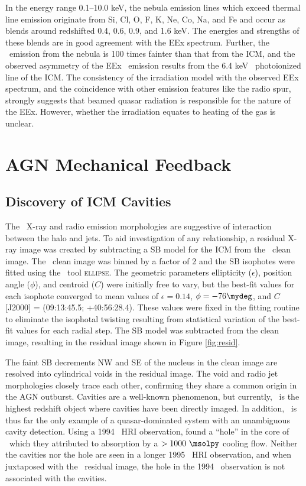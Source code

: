 \documentclass[useAMS,usenatbib]{mn2e}
\begin{document}
In the energy range 0.1--10.0 keV, the nebula emission lines which
exceed thermal line emission originate from Si, Cl, O, F, K, Ne, Co,
Na, and Fe and occur as blends around redshifted 0.4, 0.6, 0.9, and
1.6 keV. The energies and strengths of these blends are in good
agreement with the EEx spectrum. Further, the \feka\ emission from the
nebula is 100 times fainter than that from the ICM, and the observed
asymmetry of the EEx \feka\ emission results from the 6.4 keV
\feka\ photoionized line of the ICM. The consistency of the
irradiation model with the observed EEx spectrum, and the coincidence
with other emission features like the radio spur, strongly suggests
that beamed quasar radiation is responsible for the nature of the
EEx. However, whether the irradiation equates to heating of the gas is
unclear.

\section{AGN Mechanical Feedback}
\label{sec:cavs}

\subsection{Discovery of ICM Cavities}

The \irs\ X-ray and radio emission morphologies are suggestive of
interaction between the halo and jets. To aid investigation of any
relationship, a residual X-ray image was created by subtracting a SB
model for the ICM from the \cxo\ clean image. The \cxo\ clean image
was binned by a factor of 2 and the SB isophotes were fitted using the
\iraf\ tool \textsc{ellipse}. The geometric parameters ellipticity
($\epsilon$), position angle ($\phi$), and centroid ($C$) were
initially free to vary, but the best-fit values for each isophote
converged to mean values of $\epsilon = 0.14$, $\phi = -76\mydeg$, and
$C$ [J2000] = (09:13:45.5; +40:56:28.4). These values were fixed in
the fitting routine to eliminate the isophotal twisting resulting from
statistical variation of the best-fit values for each radial step. The
SB model was subtracted from the clean image, resulting in the
residual image shown in Figure \ref{fig:resid}.

The faint SB decrements NW and SE of the nucleus in the clean image
are resolved into cylindrical voids in the residual image. The void
and radio jet morphologies closely trace each other, confirming they
share a common origin in the AGN outburst. Cavities are a well-known
phenomenon, but currently, \irs\ is the highest redshift object where
cavities have been directly imaged. In addition, \irs\ is thus far the
only example of a quasar-dominated system with an unambiguous cavity
detection. Using a 1994 \rosat\ HRI observation,
\citet{1995MNRAS.274L..63F} found a ``hole'' in the core of
\rxj\ which they attributed to absorption by a $> 1000 ~\msolpy$
cooling flow. Neither the cavities nor the hole are seen in a longer
1995 \rosat\ HRI observation, and when juxtaposed with the
\cxo\ residual image, the hole in the 1994 \rosat\ observation is not
associated with the cavities.
\end{document}
